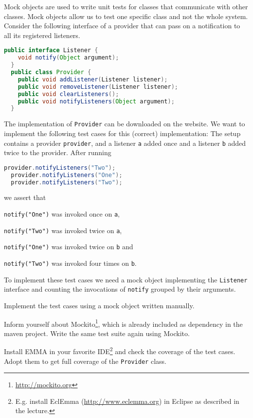 \documentclass[language=en,sheet=1,prefix]{exercise}
\begin{document}

Mock objects are used to write unit tests for classes that communicate with other classes. Mock objects allow us to test one specific class and not the whole system. Consider the following interface of a provider that can pass on a notification to all its registered listeners.
\begin{lstlisting}[language=Java,gobble=2]
  public interface Listener {
    void notify(Object argument);
  }
  public class Provider {
    public void addListener(Listener listener);
    public void removeListener(Listener listener);
    public void clearListeners();
    public void notifyListeners(Object argument);
  }
\end{lstlisting}
The implementation of \lstinline-Provider- can be downloaded on the website. We want to implement the following test cases for this (correct) implementation: The setup contains a provider \lstinline-provider-, and a listener \lstinline-a- added once and a listener \lstinline-b- added twice to the provider. After running
\begin{lstlisting}[language=Java,gobble=2]
  provider.notifyListeners("Two");
  provider.notifyListeners("One");
  provider.notifyListeners("Two");
\end{lstlisting}
we assert that
\begin{compactitem}[--]
  \item \lstinline-notify("One")- was invoked once on \lstinline-a-,
  \item \lstinline-notify("Two")- was invoked twice on \lstinline-a-,
  \item \lstinline-notify("One")- was invoked twice on \lstinline-b- and
  \item \lstinline-notify("Two")- was invoked four times on \lstinline-b-.
\end{compactitem}

To implement these test cases we need a mock object implementing the \lstinline-Listener- interface and counting the invocations of \lstinline-notify- grouped by their arguments.

\begin{compactenum}
  \item Implement the test cases using a mock object written manually.
  \item Inform yourself about Mockito\footnote{\url{http://mockito.org}}, which is already included as dependency in the maven project. Write the same test suite again using Mockito.
  \item Install EMMA in your favorite IDE\footnote{E.g. install EclEmma (\url{http://www.eclemma.org}) in Eclipse as described in the lecture.} and check the coverage of the test cases. Adopt them to get full coverage of the \lstinline-Provider- class.
\end{compactenum}
\end{document}
